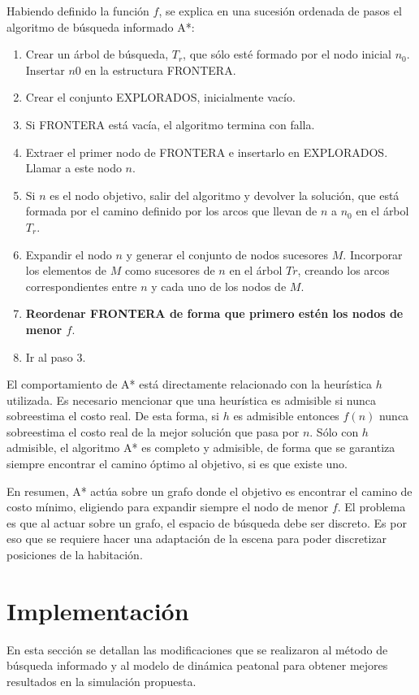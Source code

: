 \documentclass[a4paper,10pt]{article}
\begin{document}
Habiendo definido la función $f$, se explica en una sucesión ordenada de pasos el algoritmo de búsqueda informado A*:
\begin{enumerate}
\item Crear un árbol de búsqueda, $T_{r}$, que sólo esté formado por el nodo inicial $n_{0}$. Insertar $n{0}$ en la estructura FRONTERA.
\item Crear el conjunto EXPLORADOS, inicialmente vacío.
\item Si FRONTERA está vacía, el algoritmo termina con falla.
\item Extraer el primer nodo de FRONTERA e insertarlo en EXPLORADOS. Llamar a este nodo $n$.
\item Si $n$ es el nodo objetivo, salir del algoritmo y devolver la solución, que está formada por el camino definido por los arcos que llevan de $n$ a $n_{0}$ en el árbol $T_{r}$.
\item Expandir el nodo $n$ y generar el conjunto de nodos sucesores $M$. Incorporar los elementos de $M$ como sucesores de $n$ en el árbol $T{r}$, creando los arcos correspondientes entre $n$ y cada uno de los nodos de $M$.
\item \textbf{Reordenar FRONTERA de forma que primero estén los nodos de menor $f$}.
\item Ir al paso 3.
\end{enumerate}

El comportamiento de A* está directamente relacionado con la heurística $h$ utilizada. Es necesario mencionar que una heurística es admisible si nunca sobreestima el costo real. De esta forma, si $h$ es admisible entonces $f(n)$ nunca sobreestima el costo real de la mejor solución que pasa por $n$. Sólo con $h$ admisible, el algoritmo A* es completo y admisible, de forma que se garantiza siempre encontrar el camino óptimo al objetivo, si es que existe uno.

En resumen, A* actúa sobre un grafo donde el objetivo es encontrar el camino de costo mínimo, eligiendo para expandir siempre el nodo de menor $f$. El problema es que al actuar sobre un grafo, el espacio de búsqueda debe ser discreto. Es por eso que se requiere hacer una adaptación de la escena para poder discretizar posiciones de la habitación.

\section{Implementación}

En esta sección se detallan las modificaciones que se realizaron al método de búsqueda informado y al modelo de dinámica peatonal para obtener mejores resultados en la simulación propuesta.
\end{document}
